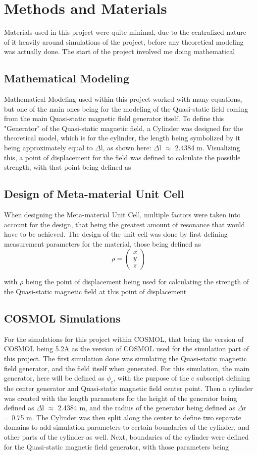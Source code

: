 \documentclass[]{article}
\begin{document}
\section{Methods and Materials} 
Materials used in this project were quite minimal, due to the centralized nature of it heavily around simulations of the project, before any theoretical modeling was actually done. The start of the project involved me doing mathematical 
\subsection{Mathematical Modeling}
Mathematical Modeling used within this project worked with many equations, but one of the main ones being for the modeling of the Quasi-static field coming from the main Quasi-static magnetic field generator itself. To define this "Generator" of the Quasi-static magnetic field, a Cylinder was designed for the theoretical model, which is for the cylinder, the length being symbolized by it being approximately equal to $\Delta$l, as shown here: $\Delta$l $\approx$ 2.4384 m. Visualizing this, a point of displacement for the field was defined to calculate the possible strength, with that point being defined as
\subsection{Design of Meta-material Unit Cell}
When designing the Meta-material Unit Cell, multiple factors were taken into account for the design, that being the greatest amount of resonance that would have to be achieved. The design of the unit cell was done by first defining measurement parameters for the material, those being defined as 
\[ \rho =  \left(\begin{array}{c}
x \\
y \\
z 
\end{array}\right)\]

with $\rho$ being the point of displacement being used for calculating the strength of the Quasi-static magnetic field at this point of displacement 
\subsection{COSMOL Simulations}
For the simulations for this project within COSMOL, that being the version of COSMOL being 5.2A as the version of COSMOL used for the simulation part of this project. The first simulation done was simulating the Quasi-static magnetic field generator, and the field itself when generated. For this simulation, the main generator, here will be defined as $\phi_c$, with the purpose of the c subscript defining the center generator and Quasi-static magnetic field center point. Then a cylinder was created with the length parameters for the height of the generator being defined as $\Delta$l $\approx$ 2.4384 m, and the radius of the generator being defined as $\Delta$r = 0.75 m. The Cylinder was then split along the center to define two separate domains to add simulation parameters to certain boundaries of the cylinder, and other parts of the cylinder as well. Next, boundaries of the cylinder were defined for the Quasi-static magnetic field generator, with those parameters being 
\end{document}

